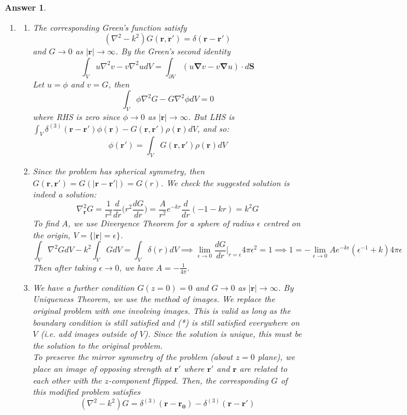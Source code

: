 \documentclass[a4paper]{article}
\newtheorem{ans}{Answer}[section]
\theoremstyle{new}
\begin{document}
\begin{ans}\leavevmode
\begin{enumerate}[label=(\alph*)]
\item 
\begin{enumerate}[label=(\roman*)]
\item The corresponding Green's function satisfy
$$(\nabla^2-k^2)G(\mathbf{r},\mathbf{r'})=\delta(\mathbf{r}-\mathbf{r'})$$
and $G\rightarrow 0$ as $|\mathbf{r}|\rightarrow\infty$. By the Green's second identity
$$\int_Vu\nabla^2v-v\nabla^2udV=\int_{\partial V}(u\boldsymbol{\nabla}v-v\boldsymbol{\nabla}u)\cdot d\mathbf{S}$$
Let $u=\phi$ and $v=G$, then 
$$\int_V\phi\nabla^2G-G\nabla^2\phi dV=0$$
where RHS is zero since $\phi\rightarrow 0$ as $|\mathbf{r}|\rightarrow\infty$. But LHS is $\int_V\delta^{(3)}(\mathbf{r}-\mathbf{r'})\phi(\mathbf{r})-G(\mathbf{r},\mathbf{r'})\rho(\mathbf{r})dV$, and so:
$$\phi(\mathbf{r'})=\int_VG(\mathbf{r},\mathbf{r'})\rho(\mathbf{r})dV$$
\item Since the problem has spherical symmetry, then $G(\mathbf{r},\mathbf{r'})=G(|\mathbf{r}-\mathbf{r'}|)=G(r)$. We check the suggested solution is indeed a solution:
$$\nabla_{\mathbf{r}}^2G=\frac{1}{r^2}\frac{d}{dr}\bigg(r^2\frac{dG}{dr}\bigg)=\frac{A}{r^2}e^{-kr}\frac{d}{dr}(-1-kr)=k^2G$$
To find $A$, we use Divergence Theorem for a sphere of radius $\epsilon$ centred on the origin, $V=\{|\mathbf{r}|=\epsilon\}$.
$$\int_V\nabla^2GdV-k^2\int_VGdV=\int_V\delta(r)dV\implies\lim_{\epsilon\rightarrow0}\frac{dG}{dr}\bigg|_{r=\epsilon}4\pi\epsilon^2=1\implies 1=-\lim_{\epsilon\rightarrow0}Ae^{-k\epsilon}(\epsilon^{-1}+k)4\pi\epsilon$$
Then after taking $\epsilon\rightarrow 0$, we have $A=-\frac{1}{4\pi}$.
\item We have a further condition $G(z=0)=0$ and $G\rightarrow 0$ as $|\mathbf{r}|\rightarrow\infty$. By Uniqueness Theorem, we use the method of images. We replace the original problem with one involving images. This is valid as long as the boundary condition is still satisfied and (*) is still satisfied everywhere on $V$ (i.e. add images outside of $V$). Since the solution is unique, this must be the solution to the original problem.\\[5pt]
To preserve the mirror symmetry of the problem (about $z=0$ plane), we place an image of opposing strength at $\mathbf{r'}$ where $\mathbf{r'}$ and $\mathbf{r}$ are related to each other with the $z$-component flipped. Then, the corresponding $G$ of this modified problem satisfies
$$(\nabla^2-k^2)G=\delta^{(3)}(\mathbf{r}-\mathbf{r_0})-\delta^{(3)}(\mathbf{r}-\mathbf{r'})$$

\end{enumerate}
\end{enumerate}
\end{ans}
\end{document}

